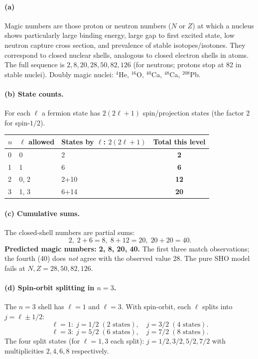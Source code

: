 \documentclass[11pt]{article}
\begin{document}
\paragraph{(a)} Magic numbers are those proton or neutron numbers ($N$ or $Z$) at which a nucleus shows particularly large binding energy, large gap to first excited state, low neutron capture cross section, and prevalence of stable isotopes/isotones. They correspond to closed nuclear shells, analogous to closed electron shells in atoms. The full sequence is $2, 8, 20, 28, 50, 82, 126$ (for neutrons; protons stop at 82 in stable nuclei). Doubly magic nuclei: $^{4}$He, $^{16}$O, $^{40}$Ca, $^{48}$Ca, $^{208}$Pb.

\paragraph{(b) State counts.} For each $\ell$ a fermion state has $2(2\ell+1)$ spin/projection states (the factor 2 for spin-$1/2$).
\begin{center}
\begin{tabular}{@{}lllc@{}}\hline
$n$ & $\ell$ allowed & States by $\ell$: $2(2\ell+1)$ & Total this level\\\hline
0 & 0 & 2 & \textbf{2}\\
1 & 1 & 6 & \textbf{6}\\
2 & 0, 2 & 2+10 & \textbf{12}\\
3 & 1, 3 & 6+14 & \textbf{20}\\\hline
\end{tabular}
\end{center}

\paragraph{(c) Cumulative sums.} The closed-shell numbers are partial sums:
\[
2,\;2+6=8,\;8+12=20,\;20+20=40.
\]
\textbf{Predicted magic numbers: 2, 8, 20, 40.} The first three match observations; the fourth (40) does \emph{not} agree with the observed value 28. The pure SHO model fails at $N,Z=28,50,82,126$.

\paragraph{(d) Spin-orbit splitting in $n=3$.} The $n=3$ shell has $\ell=1$ and $\ell=3$. With spin-orbit, each $\ell$ splits into $j=\ell\pm 1/2$:
\[
\ell=1:\;j=1/2\;(2\text{ states}),\quad j=3/2\;(4\text{ states}).
\]
\[
\ell=3:\;j=5/2\;(6\text{ states}),\quad j=7/2\;(8\text{ states}).
\]
The four split states (for $\ell=1,3$ each split): \textbf{$j=1/2,3/2,5/2,7/2$} with multiplicities $2,4,6,8$ respectively.
\end{document}

